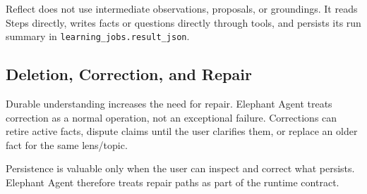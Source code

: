 Reflect does not use intermediate observations, proposals, or groundings. It
reads Steps directly, writes facts or questions directly through tools, and
persists its run summary in \texttt{learning\_jobs.result\_json}.

\subsection{Deletion, Correction, and Repair}

Durable understanding increases the need for repair. Elephant Agent treats correction as
a normal operation, not an exceptional failure. Corrections can retire active
facts, dispute claims until the user clarifies them, or replace an older fact
for the same lens/topic.

Persistence is valuable only when the user can inspect and correct what
persists. Elephant Agent therefore treats repair paths as part of the runtime contract.
